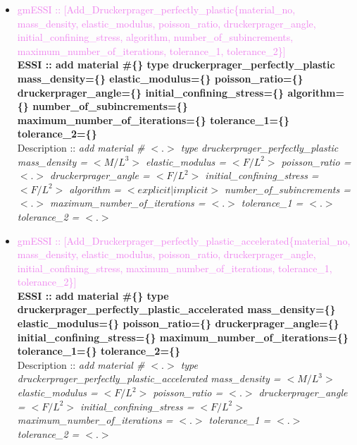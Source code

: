 \documentclass[11pt]{article}
\begin{document}
\begin{itemize}
      \item \textcolor{violet}{gmESSI :: [Add\_Druckerprager\_perfectly\_plastic\{material\_no, mass\_density, elastic\_modulus, poisson\_ratio, druckerprager\_angle, initial\_confining\_stress, algorithm, number\_of\_subincrements, maximum\_number\_of\_iterations, tolerance\_1, tolerance\_2\}]}\\
      \textbf{ESSI :: add material \#\{\} type druckerprager\_perfectly\_plastic mass\_density=\{\} elastic\_modulus=\{\} poisson\_ratio=\{\} druckerprager\_angle=\{\} initial\_confining\_stress=\{\} algorithm=\{\} number\_of\_subincrements=\{\} maximum\_number\_of\_iterations=\{\} tolerance\_1=\{\} tolerance\_2=\{\} }\\
      Description ::  \textit{ add material \# $<.>$ type druckerprager\_perfectly\_plastic  mass\_density = $<M/L^3>$ elastic\_modulus = $<F/L^2>$  poisson\_ratio = $<.>$ druckerprager\_angle = $<F/L^2>$ initial\_confining\_stress = $<F/L^2>$ algorithm = $<explicit|implicit>$  number\_of\_subincrements = $<.>$ maximum\_number\_of\_iterations = $<.>$ tolerance\_1 = $<.>$ tolerance\_2 = $<.>$} 

      \item \textcolor{violet}{gmESSI :: [Add\_Druckerprager\_perfectly\_plastic\_accelerated\{material\_no, mass\_density, elastic\_modulus, poisson\_ratio, druckerprager\_angle, initial\_confining\_stress, maximum\_number\_of\_iterations, tolerance\_1, tolerance\_2\}]}\\
      \textbf{ESSI :: add material \#\{\} type druckerprager\_perfectly\_plastic\_accelerated  mass\_density=\{\} elastic\_modulus=\{\}  poisson\_ratio=\{\} druckerprager\_angle=\{\} initial\_confining\_stress=\{\} maximum\_number\_of\_iterations=\{\} tolerance\_1=\{\} tolerance\_2=\{\} }\\
      Description ::  \textit{ add material \# $<.>$ type druckerprager\_perfectly\_plastic\_accelerated  mass\_density = $<M/L^3>$ elastic\_modulus = $<F/L^2>$  poisson\_ratio = $<.>$ druckerprager\_angle = $<F/L^2>$ initial\_confining\_stress = $<F/L^2>$ maximum\_number\_of\_iterations = $<.>$ tolerance\_1 = $<.>$ tolerance\_2 = $<.>$} 


\end{itemize}
\end{document}
